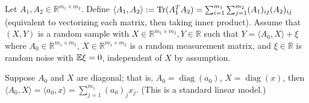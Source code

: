 Let \(A_1, A_2 \in \mathbb{R}^{m_1 \times m_2}\). Define \(\langle A_1, A_2 \rangle := \operatorname{Tr}(A_1^T A_2) = \sum_{i=1}^{m_1} \sum_{j=1}^{m_2} (A_1)_{ij} (A_2)_{ij} \) (equivalent to vectorizing each matrix, then taking inner product). Assume that \((X, Y)\) is a random sample with \(X \in \mathbb{R}^{m_1 \times m_2}, Y \in \mathbb{R}\) such that \(Y = \langle A_0, X \rangle + \xi\) where \(A_0 \in \mathbb{R}^{m_1 \times m_2}\), \(X \in \mathbb{R}^{m_1 \times m_2}\) is a random measurement matrix, and \(\xi \in \mathbb{R}\) is random noise with \(\mathbb{E} \xi =0\), independent of \(X\) by assumption.

\begin{example}

Suppose \(A_0\) and \(X\) are diagonal; that is, \(A_0 = \operatorname{diag}(a_0)\), \(X = \operatorname{diag}(x)\), then \(\langle A_0, X \rangle = \langle a_0, x \rangle = \sum_{j=1}^{m_1} (a_0)_j x_j\). (This is a standard linear model.)

\end{example}

